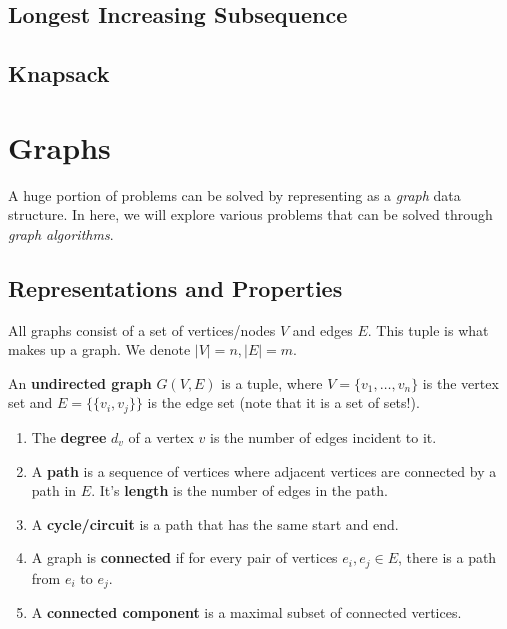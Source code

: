 \documentclass{article}
\begin{document}
  \subsection{Longest Increasing Subsequence}

  \subsection{Knapsack}

\section{Graphs}

    A huge portion of problems can be solved by representing as a \textit{graph} data structure. In here, we will explore various problems that can be solved through \textit{graph algorithms}. 

  \subsection{Representations and Properties}

    All graphs consist of a set of vertices/nodes $V$ and edges $E$. This tuple is what makes up a graph. We denote $|V| = n, |E| = m$. 

    \begin{definition}
      An \textbf{undirected graph} $G(V, E)$ is a tuple, where $V = \{v_1, \ldots, v_n\}$ is the vertex set and $E = \{\{v_i, v_j\}\}$ is the edge set (note that it is a set of sets!). 
      \begin{enumerate}
        \item The \textbf{degree} $d_v$ of a vertex $v$ is the number of edges incident to it. 
        \item A \textbf{path} is a sequence of vertices where adjacent vertices are connected by a path in $E$. It's \textbf{length} is the number of edges in the path. 
        \item A \textbf{cycle/circuit} is a path that has the same start and end. 
        \item A graph is \textbf{connected} if for every pair of vertices $e_i, e_j \in E$, there is a path from $e_i$ to $e_j$. 
        \item A \textbf{connected component} is a maximal subset of connected vertices. 
      \end{enumerate}
    \end{definition}
\end{document}
